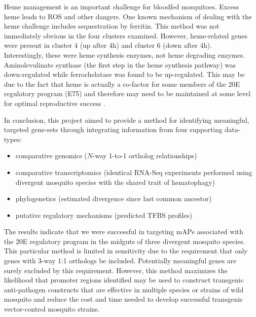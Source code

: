Heme management is an important challenge for bloodfed mosquitoes.
%
Excess heme leads to \gls{ROS} and other dangers.
%
One known mechanism of dealing with the heme challenge includes sequestration by ferritin.
%
This method was not immediately obvious in the four clusters examined.
%
However, heme-related genes were present in cluster 4 (up after 4h) and cluster 6 (down after 4h).
%
Interestingly, these were heme synthesis enzymes, not heme degrading enzymes.
%
Aminolevulinate synthase (the first step in the heme synthesis pathway) was down-regulated while ferrochelatase was found to be up-regulated.
%
This may be due to the fact that heme is actually a co-factor for some members of the \gls{20E} regulatory program (E75) and therefore may need to be maintained at some level for optimal reproductive success \cite{Reinking2005}.


In conclusion, this project aimed to provide a method for identifying meaningful, targeted gene-sets through integrating information from four supporting data-types:

\begin{itemize}
    \item comparative genomics ($N$-way 1-to-1 ortholog relationships)
    \item comparative transcriptomics (identical \gls{RNA-Seq} experiments performed using divergent mosquito species with the shared trait of \gls{hematophagy})
    \item phylogenetics (estimated divergence since last common ancestor)
    \item putative regulatory mechanisms (predicted \gls{TFBS} profiles)
\end{itemize}

The results indicate that we were successful in targeting \glspl{mAP} associated with the \gls{20E} regulatory program in the midguts of three divergent mosquito species.
%
This particular method is limited in sensitivity due to the requirement that only genes with 3-way 1:1 orthologs be included.
%
Potentially meaningful genes are surely excluded by this requirement.
%
However, this method maximizes the likelihood that promoter regions identified may be used to construct transgenic anti-pathogen constructs that are effective in multiple species or strains of wild mosquito and reduce the cost and time needed to develop successful transgenic vector-control mosquito strains.




